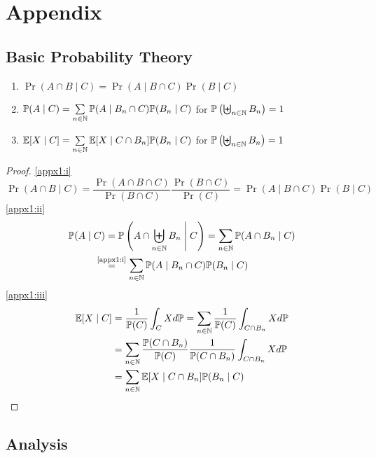 \chapter{Appendix}
\section{Basic Probability Theory}
\begin{lemma}\leavevmode \label{appx1}
    \begin{enumerate}[label=(\roman*), font=\normalfont]
        \item\label{appx1:i} \(\Pr(A\cap B\mid C) = \Pr(A \mid B \cap C)\Pr(B\mid C) \)
        \item\label{appx1:ii} \(\mathbb{P}(A\mid C)=\sum\limits_{n\in\mathbb{N}} \mathbb{P}(A \mid B_n \cap C)\mathbb{P}(B_n\mid C)  \)
        for  \(\mathbb{P}\left(\biguplus_{n\in\mathbb{N}}B_n\right)=1 \)
        \item\label{appx1:iii} \(\mathbb{E}[X\mid C]=\sum\limits_{n\in\mathbb{N}} \mathbb{E}[X\mid C \cap B_n] \mathbb{P}(B_n \mid C) \) for  \(\mathbb{P}\left(\biguplus_{n\in\mathbb{N}}B_n\right)=1 \)
    \end{enumerate}
\end{lemma}
\begin{proof}
    \ref{appx1:i}
    \[
        \Pr(A\cap B\mid C)
        =\frac{\Pr(A\cap B\cap C)}{\Pr(B\cap C)}\frac{\Pr(B\cap C)}{\Pr(C)}
        =\Pr(A\mid B\cap C)\Pr(B\mid C)
    \]
    \ref{appx1:ii}
    \begin{align*}
        \Pr(A\mid C)&=\Pr\left(A\cap \biguplus_{n\in\N} B_n \;\middle|\; C\right)
        =\sum_{n\in\N} \Pr(A\cap B_n\mid C)\\
        &\lxeq{\text{\ref{appx1:i}}} \sum_{n\in\N} \Pr(A \mid B_n \cap C)\Pr(B_n\mid C)
    \end{align*}
    \ref{appx1:iii}
    \begin{align*}
        \mathbb{E}[X\mid C]
        &=\frac{1}{\mathbb{P}(C)} \int_C X d\mathbb{P} 
        =\sum_{n\in\mathbb{N}}\frac{1}{\mathbb{P}(C)} \int_{C\cap B_n} X d\mathbb{P}\\
        &=\sum_{n\in\mathbb{N}} \frac{\mathbb{P}(C\cap B_n)}{\mathbb{P}(C)} \frac{1}{\mathbb{P}(C\cap B_n)} 
        \int_{C\cap B_n} X d\mathbb{P} \\
        &=\sum_{n\in\mathbb{N}}\mathbb{E}[X\mid C\cap B_n]\mathbb{P}(B_n\mid C) \qedhere
    \end{align*}
\end{proof}
\section{Analysis}
\endinput
